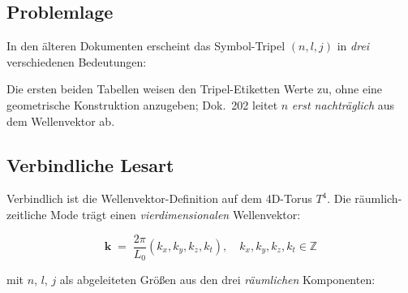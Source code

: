 \subsection*{Problemlage}

In den älteren Dokumenten erscheint das Symbol-Tripel $(n,l,j)$ in
\emph{drei} verschiedenen Bedeutungen:

\begin{center}
\renewcommand{\arraystretch}{1.4}
{\footnotesize
{}
}
\renewcommand{\arraystretch}{1.0}
\end{center}

Die ersten beiden Tabellen weisen den Tripel-Etiketten Werte zu, ohne
eine geometrische Konstruktion anzugeben; Dok.~202 leitet $n$
\emph{erst nachträglich} aus dem Wellenvektor ab.

\subsection*{Verbindliche Lesart}

Verbindlich ist die Wellenvektor-Definition auf dem 4D-Torus $T^4$.
Die räumlich-zeitliche Mode trägt einen \emph{vierdimensionalen}
Wellenvektor:

\begin{equation}
  \boxed{\;\mathbf{k} \;=\; \frac{2\pi}{L_0}(k_x,k_y,k_z,k_t),
  \quad k_x,k_y,k_z,k_t \in \mathbb{Z}\;}
  \tag{210.4}
\end{equation}

mit $n$, $l$, $j$ als abgeleiteten Größen aus den drei
\emph{räumlichen} Komponenten:


